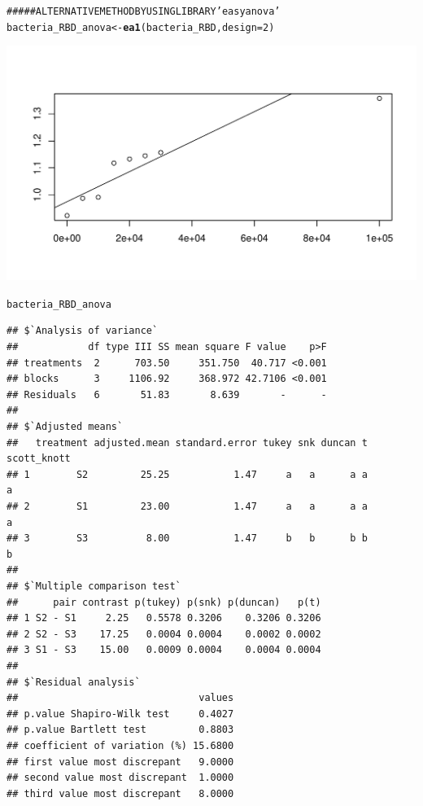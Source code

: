 \documentclass[a4paper]{article}\usepackage{graphicx, color}
\makeatletter
\def\maxwidth{ %
  \ifdim\Gin@nat@width>\linewidth
    \linewidth
  \else
    \Gin@nat@width
  \fi
}
\newcommand{\hlfunctioncall}[1]{\textcolor[rgb]{0.501960784313725,0,0.329411764705882}{\textbf{#1}}}%
\newcommand{\hlcomment}[1]{\textcolor[rgb]{0.180392156862745,0.6,0.341176470588235}{#1}}%
\newenvironment{kframe}{%
 \def\at@end@of@kframe{}%
 \ifinner\ifhmode%
  \def\at@end@of@kframe{\end{minipage}}%
  \begin{minipage}{\columnwidth}%
 \fi\fi%
 \def\FrameCommand##1{\hskip\@totalleftmargin \hskip-\fboxsep
 \colorbox{shadecolor}{##1}\hskip-\fboxsep
     \hskip-\linewidth \hskip-\@totalleftmargin \hskip\columnwidth}%
 \MakeFramed {\advance\hsize-\width
   \@totalleftmargin\z@ \linewidth\hsize
   \@setminipage}}%
 {\par\unskip\endMakeFramed%
 \at@end@of@kframe}
\newenvironment{knitrout}{}{} %
\makeatother
\begin{document}
\begin{knitrout}
\begin{kframe}
\begin{alltt}
\hlcomment{##### ALTERNATIVE METHOD BY USING LIBRARY 'easyanova'}
bacteria_RBD_anova <- \hlfunctioncall{ea1}(bacteria_RBD, design = 2)
\end{alltt}
\end{kframe}
\includegraphics[width=\maxwidth]{figure/unnamed-chunk-3} 
\begin{kframe}\begin{alltt}
bacteria_RBD_anova
\end{alltt}
\begin{verbatim}
## $`Analysis of variance`
##            df type III SS mean square F value    p>F
## treatments  2      703.50     351.750  40.717 <0.001
## blocks      3     1106.92     368.972 42.7106 <0.001
## Residuals   6       51.83       8.639       -      -
## 
## $`Adjusted means`
##   treatment adjusted.mean standard.error tukey snk duncan t scott_knott
## 1        S2         25.25           1.47     a   a      a a           a
## 2        S1         23.00           1.47     a   a      a a           a
## 3        S3          8.00           1.47     b   b      b b           b
## 
## $`Multiple comparison test`
##      pair contrast p(tukey) p(snk) p(duncan)   p(t)
## 1 S2 - S1     2.25   0.5578 0.3206    0.3206 0.3206
## 2 S2 - S3    17.25   0.0004 0.0004    0.0002 0.0002
## 3 S1 - S3    15.00   0.0009 0.0004    0.0004 0.0004
## 
## $`Residual analysis`
##                               values
## p.value Shapiro-Wilk test     0.4027
## p.value Bartlett test         0.8803
## coefficient of variation (%) 15.6800
## first value most discrepant   9.0000
## second value most discrepant  1.0000
## third value most discrepant   8.0000
\end{verbatim}
\begin{alltt}

\end{alltt}
\end{kframe}
\end{knitrout}
\end{document}
